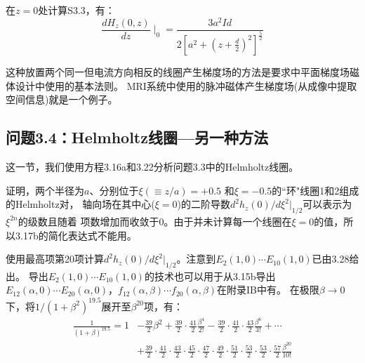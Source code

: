 在$z=0$处计算S3.3，有：
\begin{equation*}
\frac{dH_z(0,z)}{dz}\mid_0=\frac{3a^2Id}{2[a^2+(z+\frac{d}{2})^2]^\frac{5}{2}}
\end{equation*}

这种放置两个同一但电流方向相反的线圈产生梯度场的方法是要求中平面梯度场磁体设计中使用的基本法则。
MRI系统中使用的脉冲磁体产生梯度场(从成像中提取空间信息)就是一个例子。


\subsection{问题3.4：Helmholtz线圈---另一种方法}
这一节，我们使用方程3.16a和3.22分析问题3.3中的Helmholtz线圈。

证明，两个半径为$a$、分别位于$\xi(\equiv z/a)=+0.5$ 和$\xi=−0.5$的``环"线圈1和2组成的Helmholtz对，
轴向场在其中心($\xi=0$)的二阶导数$d^2 h_z(0)/d\xi^2|_{1/2}$可以表示为$\xi^{2n}$的级数且随着
项数增加而收敛于0。由于并未计算每一个线圈在$\xi=0$的值，所以3.17b的简化表达式不能用。


使用最高项第20项计算$d^2 h_z(0)/d\xi^2|_{1/2}$。注意到$E_2(1, 0)\cdots E_{10}(1, 0)$已由3.28给出。
导出$E_2(1, 0)\cdots E_{10}(1, 0)$的技术也可以用于从3.15b导出$E_{12}(\alpha, 0)\cdots E_{20}(\alpha, 0)$，$f_{12}(\alpha,\beta)\cdots f_{20}(\alpha,\beta)$在附录IB中有。
在极限$\beta\rightarrow 0$下，将$1/(1+\beta^2)^{19.5}$展开至$\beta^{20}$项，有：
\begin{equation}%
\begin{split}
\frac{1}{(1+\beta)^{19.5}}=1&-\frac{39}{2}\beta^2+\frac{39}{2}\cdot\frac{41}{2}\frac{\beta^4}{2!}-\frac{39}{2}\cdot\frac{41}{2}\cdot\frac{43}{2}\frac{\beta^6}{3!}+\cdots\\
&+\frac{39}{2}\cdot\frac{41}{2}\cdot\frac{43}{2}\cdot\frac{45}{2}\cdot\frac{47}{2}\cdot\frac{49}{2}\cdot\frac{51}{2}\cdot\frac{53}{2}
\cdot\frac{53}{2}\cdot\frac{57}{2}\frac{\beta^{20}}{10!}
\end{split}
\end{equation}

